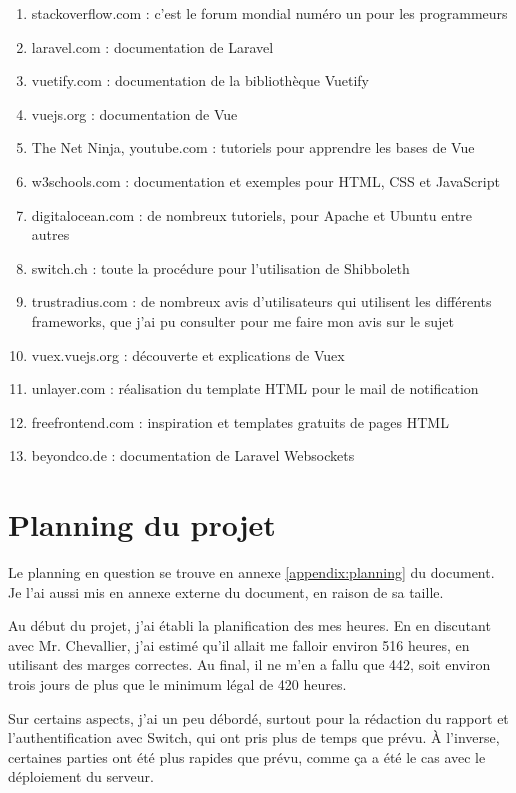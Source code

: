 \documentclass[
    iai, %
    eai, %
]{heig-tb}
\begin{document}
\begin{enumerate}
  \item stackoverflow.com : c'est le forum mondial numéro un pour les programmeurs\cite{stackoverflow}
  \item laravel.com : documentation de Laravel\cite{laravel}
  \item vuetify.com : documentation de la bibliothèque Vuetify\cite{vuetify}
  \item vuejs.org : documentation de Vue\cite{vue}
  \item The Net Ninja, youtube.com : tutoriels pour apprendre les bases de Vue\cite{ninja}
  \item w3schools.com : documentation et exemples pour HTML, CSS et JavaScript\cite{w3schools}
  \item digitalocean.com : de nombreux tutoriels, pour Apache et Ubuntu entre autres\cite{digitalocean}
  \item switch.ch : toute la procédure pour l'utilisation de Shibboleth\cite{switch}
  \item trustradius.com : de nombreux avis d'utilisateurs qui utilisent les différents frameworks, que j'ai pu consulter pour me faire mon avis sur le sujet\cite{trustradius}
  \item vuex.vuejs.org : découverte et explications de Vuex\cite{vuex}
  \item unlayer.com : réalisation du template HTML pour le mail de notification\cite{unlayer}
  \item freefrontend.com : inspiration et templates gratuits de pages HTML\cite{freefrontend}
  \item beyondco.de : documentation de Laravel Websockets\cite{websockets}
\end{enumerate}

\section{Planning du projet}
Le planning en question se trouve en annexe \ref{appendix:planning} du document. Je l'ai aussi mis en annexe externe du document, en raison de sa taille.

Au début du projet, j'ai établi la planification des mes heures. En en discutant avec Mr. Chevallier, j'ai estimé qu'il allait me falloir environ 516 heures, en utilisant des marges correctes.
Au final, il ne m'en a fallu que 442, soit environ trois jours de plus que le minimum légal de 420 heures.

Sur certains aspects, j'ai un peu débordé, surtout pour la rédaction du rapport et l'authentification avec Switch, qui ont pris plus de temps que prévu.
À l'inverse, certaines parties ont été plus rapides que prévu, comme ça a été le cas avec le déploiement du serveur.
\end{document}
